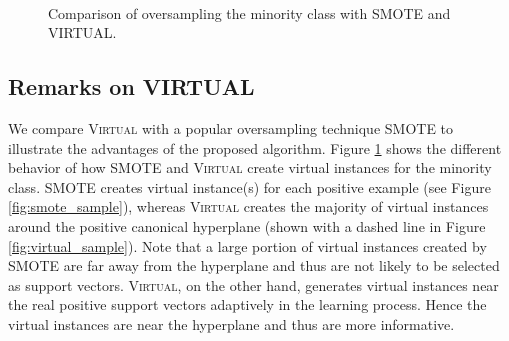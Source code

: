 \begin{figure}[t!bp]
  \begin{center}
     \mbox{
       \quad
      }
    \caption{Comparison of oversampling the minority class with SMOTE and VIRTUAL. }
    \label{fig:oversample}
  \end{center}
\end{figure}

\subsection{Remarks on VIRTUAL}
We compare \textsc{Virtual} with a popular oversampling technique SMOTE to  illustrate the advantages of the proposed algorithm. Figure \ref{fig:oversample} shows the different behavior of how SMOTE and \textsc{Virtual} create virtual instances for the minority class. SMOTE creates virtual instance(s) for each positive example (see Figure \ref{fig:smote_sample}), whereas \textsc{Virtual} creates the majority of virtual instances around the positive canonical hyperplane (shown with a dashed line in Figure \ref{fig:virtual_sample}). Note that a large portion of virtual instances created by SMOTE are far away from the hyperplane and thus are not likely to be selected as support vectors. \textsc{Virtual}, on the other hand, generates virtual instances near the real positive support vectors adaptively in the learning process. Hence the virtual instances are near the hyperplane and thus are more informative.

